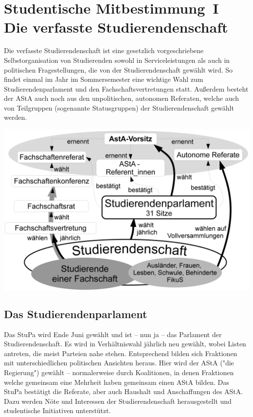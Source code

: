 \section[Studentische Mitbestimmung]{Studentische Mitbestimmung~I\\Die verfasste Studierendenschaft}
\label{studmit}
\begin{multicols*}{2}
Die verfasste Studierendenschaft ist eine gesetzlich vorgeschriebene Selbstorganisation von Studierenden sowohl in Serviceleistungen als auch in politischen Fragestellungen, die von der Studierendenschaft gewählt wird.
So findet einmal im Jahr im Sommersemester eine wichtige Wahl zum Studierendenparlament und den Fachschaftsvertretungen statt.
Außerdem besteht der AStA auch noch aus den unpolitischen, autonomen Referaten, welche auch von Teilgruppen (sogenannte Statusgruppen) der Studierendenschaft gewählt werden.

\bigskip
\includegraphics[width=\columnwidth]{res/verfasste_studierendenschaft.png}
\bigskip

\subsection{Das Studierendenparlament}
Das StuPa wird Ende Juni gewählt und ist – nun ja – das Parlament der Studierendenschaft. Es wird in Verhältniswahl jährlich neu gewählt, wobei Listen antreten, die meist Parteien nahe stehen. Entsprechend bilden sich Fraktionen mit unterschiedlichen politischen Ansichten heraus.
Hier wird der AStA ("die Regierung") gewählt – normalerweise durch Koalitionen, in denen Fraktionen welche gemeinsam eine Mehrheit haben gemeinsam einen AStA bilden. Das StuPa bestätigt die Referate, aber auch Haushalt und Anschaffungen des AStA. Dazu werden Nöte und Interessen der Studierendenschaft herausgestellt und studentische Initiativen unterstützt.


\end{multicols*}
